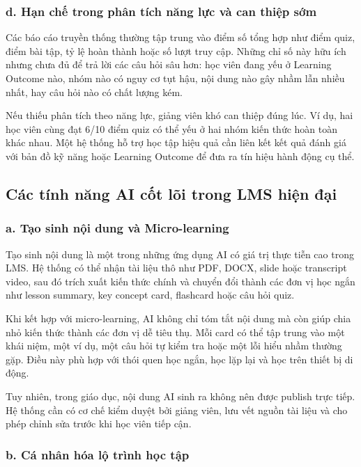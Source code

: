 \subsubsection*{d. Hạn chế trong phân tích năng lực và can thiệp sớm}

Các báo cáo truyền thống thường tập trung vào điểm số tổng hợp như điểm quiz,
điểm bài tập, tỷ lệ hoàn thành hoặc số lượt truy cập. Những chỉ số này hữu ích
nhưng chưa đủ để trả lời các câu hỏi sâu hơn: học viên đang yếu ở Learning
Outcome nào, nhóm nào có nguy cơ tụt hậu, nội dung nào gây nhầm lẫn nhiều nhất,
hay câu hỏi nào có chất lượng kém.

Nếu thiếu phân tích theo năng lực, giảng viên khó can thiệp đúng lúc. Ví dụ,
hai học viên cùng đạt 6/10 điểm quiz có thể yếu ở hai nhóm kiến thức hoàn toàn
khác nhau. Một hệ thống hỗ trợ học tập hiệu quả cần liên kết kết quả đánh giá
với bản đồ kỹ năng hoặc Learning Outcome để đưa ra tín hiệu hành động cụ thể.

\subsection{Các tính năng AI cốt lõi trong LMS hiện đại}

\subsubsection*{a. Tạo sinh nội dung và Micro-learning}

Tạo sinh nội dung là một trong những ứng dụng AI có giá trị thực tiễn cao trong
LMS. Hệ thống có thể nhận tài liệu thô như PDF, DOCX, slide hoặc transcript
video, sau đó trích xuất kiến thức chính và chuyển đổi thành các đơn vị học
ngắn như lesson summary, key concept card, flashcard hoặc câu hỏi quiz.

Khi kết hợp với micro-learning, AI không chỉ tóm tắt nội dung mà còn giúp chia
nhỏ kiến thức thành các đơn vị dễ tiêu thụ. Mỗi card có thể tập trung vào một
khái niệm, một ví dụ, một câu hỏi tự kiểm tra hoặc một lỗi hiểu nhầm thường
gặp. Điều này phù hợp với thói quen học ngắn, học lặp lại và học trên thiết bị
di động.

Tuy nhiên, trong giáo dục, nội dung AI sinh ra không nên được publish trực
tiếp. Hệ thống cần có cơ chế kiểm duyệt bởi giảng viên, lưu vết nguồn tài liệu
và cho phép chỉnh sửa trước khi học viên tiếp cận.

\subsubsection*{b. Cá nhân hóa lộ trình học tập}

